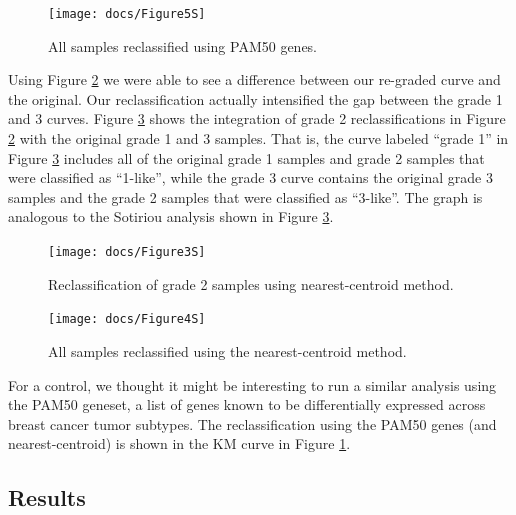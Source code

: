 \documentclass[a4paper,10pt]{article}
\begin{document}
 \begin{figure}
\vspace{-10pt}
\centering
\texttt{[image: docs/Figure5S]}
\caption{All samples reclassified using PAM50 genes.}\label{5S}
\vspace{-30pt}
\end{figure}
Using Figure \ref{3S} we were able to see a difference between our re-graded curve 
and the original. Our reclassification actually intensified the gap between the grade 1 and 3 curves.
Figure \ref{4S} shows the integration of grade 2 reclassifications in Figure  \ref{3S} with 
the original grade 1 and 3 samples. That is, the curve labeled “grade 1” in 
Figure  \ref{4S} includes all of the original grade 1 samples and grade 2 samples 
that were classified as “1-like”, while the grade 3 curve contains the original
 grade 3 samples and the grade 2 samples that were classified as “3-like”. 
The graph is analogous to the Sotiriou analysis shown in Figure \ref{4S}.
\begin{figure}[b!]
\centering
\texttt{[image: docs/Figure3S]}
\caption{Reclassification of grade 2 samples using nearest-centroid method.}\label{3S}
\end{figure}

\begin{figure}
\centering
\vspace{-10pt}
\texttt{[image: docs/Figure4S]}
\caption{All samples reclassified using the nearest-centroid method.}\label{4S}
\vspace{-10pt}
\end{figure}


For a control, we thought it might be interesting to run a similar 
analysis using the PAM50 geneset, a list of genes known to be differentially
 expressed across breast cancer tumor subtypes. The reclassification using 
the PAM50 genes (and nearest-centroid) is shown in the KM curve in Figure \ref{5S}.

\subsection{Results}
\end{document}
